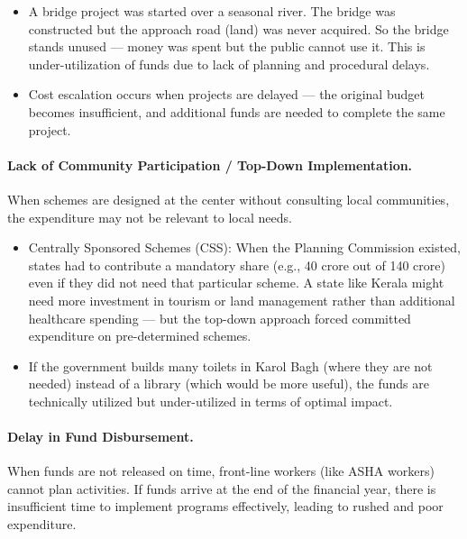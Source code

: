 \begin{ExampleBox}
\begin{itemize}
\item A bridge project was started over a seasonal river. The bridge was constructed but the approach road (land) was never acquired. So the bridge stands unused --- money was spent but the public cannot use it. This is under-utilization of funds due to lack of planning and procedural delays.
\item Cost escalation occurs when projects are delayed --- the original budget becomes insufficient, and additional funds are needed to complete the same project.
\end{itemize}
\end{ExampleBox}

\paragraph{Lack of Community Participation / Top-Down Implementation.} When schemes are designed at the center without consulting local communities, the expenditure may not be relevant to local needs.

\begin{ExampleBox}
\begin{itemize}
\item Centrally Sponsored Schemes (CSS): When the Planning Commission existed, states had to contribute a mandatory share (e.g., 40 crore out of 140 crore) even if they did not need that particular scheme. A state like Kerala might need more investment in tourism or land management rather than additional healthcare spending --- but the top-down approach forced committed expenditure on pre-determined schemes.
\item If the government builds many toilets in Karol Bagh (where they are not needed) instead of a library (which would be more useful), the funds are technically utilized but under-utilized in terms of optimal impact.
\end{itemize}
\end{ExampleBox}

\paragraph{Delay in Fund Disbursement.} When funds are not released on time, front-line workers (like ASHA workers) cannot plan activities. If funds arrive at the end of the financial year, there is insufficient time to implement programs effectively, leading to rushed and poor expenditure.


